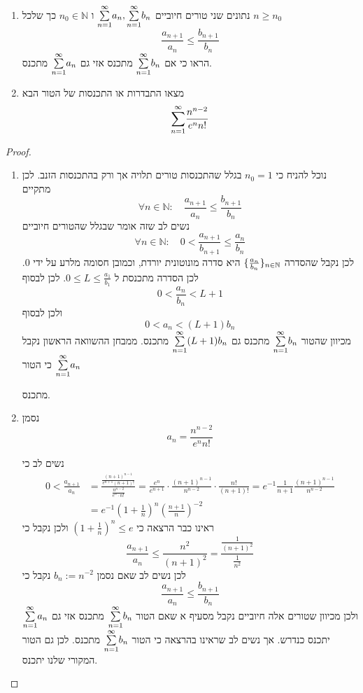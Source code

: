 \documentclass{article}
\begin{document}
\bigskip

\begin{exercise}
\begin{enumerate}
\item 
נתונים שני טורים חיוביים 
$\overset{\infty}{\underset{n=1}{\sum}} a_n, \overset{\infty}{\underset{n=1}{\sum}} b_n$
ו 
$n_0\in\mathbb{N}$
כך שלכל 
$n\geq n_0$
\[\frac{a_{n+1}}{a_n}\leq \frac{b_{n+1}}{b_n}\]
הראו כי אם 
$\overset{\infty}{\underset{n=1}{\sum}} b_n$
מתכנס אזי גם 
$\overset{\infty}{\underset{n=1}{\sum}} a_n$
מתכנס.
\item 
מצאו התבדרות או התכנסות של הטור הבא 
\[\overset{\infty}{\underset{n=1}{\sum}} \frac{n^{n-2}}{e^n n!}\]
\end{enumerate}
\end{exercise}

\begin{proof}
\begin{enumerate}
\item 
נוכל להניח כי 
$n_0=1$
בגלל שהתכנסות טורים תלויה אך ורק בהתכנסות הזנב. לכן מתקיים
\[\forall n\in\mathbb{N}:\quad \frac{a_{n+1}}{a_n}\leq \frac{b_{n+1}}{b_n}\]
נשים לב שזה אומר שבגלל שהטורים חיוביים
\[\forall n\in\mathbb{N}:\quad 0<\frac{a_{n+1}}{b_{n+1}}\leq \frac{a_n}{b_n}\]
לכן נקבל שהסדרה 
$\{\frac{a_n}{b_n}\}_{n\in\mathbb{N}}$
היא סדרה מונוטונית יורדת, וכמובן חסומה מלרע על ידי 0. לכן הסדרה מתכנסת ל 
$0\leq L\leq\frac{a_1}{b_1}$.
לכן לבסוף 
\[0<\frac{a_n}{b_n}<L+ 1\]
ולכן לבסוף 
\[0<a_n<(L+1)b_n\]
מכיוון שהטור 
$\overset{\infty}{\underset{n=1}{\sum}} b_n$
מתכנס גם 
$\overset{\infty}{\underset{n=1}{\sum}} (L+1) b_n$
מתכנס. ממבחן ההשוואה הראשון נקבל כי הטור
$\overset{\infty}{\underset{n=1}{\sum}} a_n$ 

מתכנס.
\item 
נסמן 
\[a_n = \frac{n^{n-2}}{e^n n!}\]

נשים לב כי 
\begin{align*}
0<\frac{a_{n+1}}{a_n} &=\frac{\frac{(n+1)^{n-1}}{e^{n+1}(n+1)!}}{\frac{n^{n-2}}{e^n\cdot n!}} = \frac{e^n}{e^{n+1}} \cdot \frac{(n+1)^{n-1}}{n^{n-2}}\cdot \frac{n!}{(n+1)!}=e^{-1}\frac{1}{n+1}\frac{(n+1)^{n-1}}{n^{n-2}} \\ 
&= e^{-1} \left(1+\frac{1}{n}\right)^n \left(\frac{n+1}{n}\right)^{-2} 
\end{align*}
ראינו כבר הרצאה כי 
$\left(1+\frac{1}{n}\right)^n\leq e$
ולכן נקבל כי 
\[\frac{a_{n+1}}{a_n}\leq \frac{n^2}{(n+1)^2} = \frac{\frac{1}{(n+1)^2}}{\frac{1}{n^2}} \]
לכן נשים לב שאם נסמן 
$b_n:=n^{-2}$
נקבל כי 
\[\frac{a_{n+1}}{a_n}\leq \frac{b_{n+1}}{b_n}\]
ולכן מכיוון שטורים אלה חיוביים נקבל מסעיף א שאם הטור 
$\overset{\infty}{\underset{n=1}{\sum}} b_n$
מתכנס אזי גם 
$\overset{\infty}{\underset{n=1}{\sum}} a_n$ 
יתכנס כנדרש. אך נשים לב שראינו בהרצאה כי הטור 
$\overset{\infty}{\underset{n=1}{\sum}} b_n$
מתכנס. לכן גם הטור המקורי שלנו יתכנס. 

\end{enumerate}
\end{proof}
\end{document}
